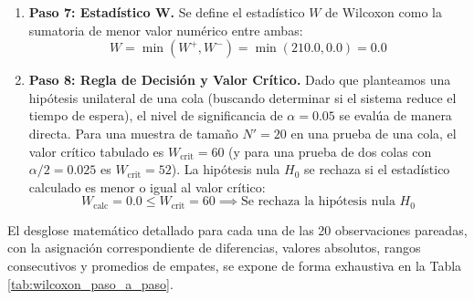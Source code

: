 \begin{enumerate}
    \begin{itemize}
        \item Suma de rangos positivos ($W^+$):
        $$W^+ = \sum_{d_i > 0} R_i = 1.0 + 2.0 + 3.0 + \dots + 20.0 = 210.0$$
        \item Suma de rangos negativos ($W^-$):
        $$W^- = \sum_{d_i < 0} R_i = 0.0$$
    \end{itemize}
    \item \textbf{Paso 7: Estadístico W.} Se define el estadístico $W$ de Wilcoxon como la sumatoria de menor valor numérico entre ambas:
    $$W = \min(W^+, W^-) = \min(210.0, 0.0) = 0.0$$
    \item \textbf{Paso 8: Regla de Decisión y Valor Crítico.} Dado que planteamos una hipótesis unilateral de una cola (buscando determinar si el sistema reduce el tiempo de espera), el nivel de significancia de $\alpha = 0.05$ se evalúa de manera directa. Para una muestra de tamaño $N' = 20$ en una prueba de una cola, el valor crítico tabulado es $W_{\text{crit}} = 60$ (y para una prueba de dos colas con $\alpha/2=0.025$ es $W_{\text{crit}} = 52$). La hipótesis nula $H_0$ se rechaza si el estadístico calculado es menor o igual al valor crítico:
    $$W_{\text{calc}} = 0.0 \le W_{\text{crit}} = 60 \implies \text{Se rechaza la hipótesis nula } H_0$$
\end{enumerate}

El desglose matemático detallado para cada una de las 20 observaciones pareadas, con la asignación correspondiente de diferencias, valores absolutos, rangos consecutivos y promedios de empates, se expone de forma exhaustiva en la Tabla \ref{tab:wilcoxon_paso_a_paso}.

